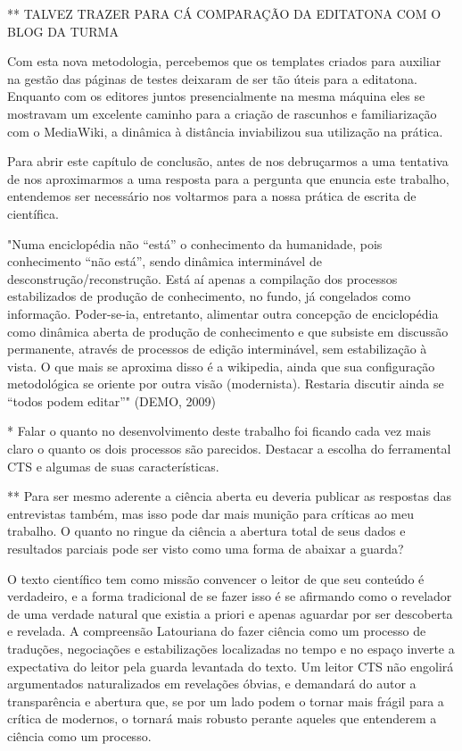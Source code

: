 ** TALVEZ TRAZER PARA CÁ COMPARAÇÃO DA EDITATONA COM O BLOG DA TURMA


Com esta nova metodologia, percebemos que os templates criados para auxiliar na gestão das páginas de testes deixaram de ser tão úteis para a editatona. Enquanto com os editores juntos presencialmente na mesma máquina eles se mostravam um excelente caminho para a criação de rascunhos e familiarização com o MediaWiki, a dinâmica à distância inviabilizou sua utilização na prática.


Para abrir este capítulo de conclusão, antes de nos debruçarmos a uma tentativa de nos aproximarmos a uma resposta para a pergunta que enuncia este trabalho, entendemos ser necessário nos voltarmos para a nossa prática de escrita de científica.

"Numa enciclopédia não “está” o conhecimento da humanidade, pois conhecimento “não está”, sendo dinâmica interminável de desconstrução/reconstrução. Está aí apenas a compilação dos processos estabilizados de produção de conhecimento, no fundo, já congelados como informação. Poder-se-ia, entretanto, alimentar outra concepção de enciclopédia como dinâmica aberta de produção de conhecimento e que subsiste em discussão permanente, através de processos de edição interminável, sem estabilização à vista. O que mais se aproxima disso é a wikipedia, ainda que sua configuração metodológica se oriente por outra visão (modernista). Restaria discutir ainda se “todos podem editar”" (DEMO, 2009)

* Falar o quanto no desenvolvimento deste trabalho foi ficando cada vez mais claro o quanto os dois processos são parecidos. Destacar a escolha do ferramental CTS e algumas de suas características.

** Para ser mesmo aderente a ciência aberta eu deveria publicar as respostas das entrevistas também, mas isso pode dar mais munição para críticas ao meu trabalho.
O quanto no ringue da ciência a abertura total de seus dados e resultados parciais pode ser visto como uma forma de abaixar a guarda?

O texto científico tem como missão convencer o leitor de que seu conteúdo é verdadeiro, e a forma tradicional de se fazer isso é se afirmando como o revelador de uma verdade natural que existia a priori e apenas aguardar por ser descoberta e revelada. A compreensão Latouriana do fazer ciência como um processo de traduções, negociações e estabilizações localizadas no tempo e no espaço inverte a expectativa do leitor pela guarda levantada do texto. Um leitor CTS não engolirá argumentados naturalizados em revelações óbvias, e demandará do autor a transparência e abertura que, se por um lado podem o tornar mais frágil para a crítica de modernos, o tornará mais robusto perante aqueles que entenderem a ciência como um processo.

